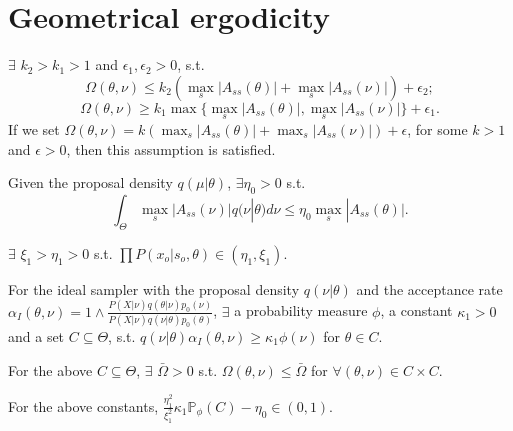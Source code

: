 \section{Geometrical ergodicity}
\begin{assumption}
$\exists$ $k_2 > k_1 > 1$ and $\epsilon_1, \epsilon_2 > 0$, s.t. 
$$\Omega(\theta, \nu) \leq k_2 (  \max_s|A_{ss}(\theta)| +  \max_s|A_{ss}(\nu)| ) + \epsilon_2 ;$$
$$\Omega(\theta, \nu) \geq k_1 \max \{ \max_s|A_{ss}(\theta)|, \max_s|A_{ss}(\nu)| \} + \epsilon_1.$$ 
If we set $\Omega(\theta, \nu) = k (  \max_s|A_{ss}(\theta)| +  \max_s|A_{ss}(\nu)| ) + \epsilon$, for some $k > 1$ and $\epsilon > 0$, then this assumption is satisfied.
\end{assumption}

\begin{assumption}
Given the proposal density $q(\mu | \theta)$, $\exists \eta_0 > 0$ s.t. $$ \int_\Theta \max_s|A_{ss}(\nu)| q(\nu | \theta)d\nu \leq \eta_0 \max_s|A_{ss}(\theta)|.$$
\end{assumption}

\begin{assumption}
$\exists$ $ \xi_1 > \eta_1 > 0$ s.t. $\prod P(x_o | s_o, \theta) \in (\eta_1, \xi_1)$.
\end{assumption}

\begin{assumption}
For the ideal sampler with the proposal density $q(\nu| \theta)$ and the acceptance rate $\alpha_I(\theta, \nu) = 1 \wedge \frac{P(X | \nu)q(\theta| \nu)p_0(\nu)}{P(X | \nu)q(\nu| \theta)p_0(\theta)}$, $\exists$ a probability measure $\phi$, a constant $\kappa_1 > 0$ and a set $C \subseteq \Theta$, s.t. $q(\nu | \theta) \alpha_I(\theta, \nu) \geq \kappa_1 \phi(\nu)$ for $\theta \in C$. 
\end{assumption}

\begin{assumption}
For the above $C \subseteq \Theta$, $\exists$ $\bar{\Omega} > 0$ s.t. $\Omega(\theta, \nu)  \leq \bar{\Omega}$ for $\forall (\theta, \nu) \in C \times C$.
\end{assumption}

\begin{assumption}
For the above constants, $\frac{\eta_1^2}{\xi_1^2} \kappa_1 \mathbb{P}_\phi(C)  - \eta_0 \in (0, 1).$
\end{assumption}

